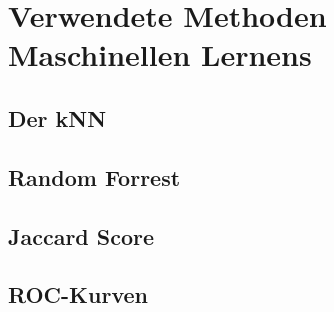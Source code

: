 \section{Verwendete Methoden Maschinellen Lernens}
\label{sec:lerner}

\subsection{Der kNN}

\subsection{Random Forrest}

\subsection{Jaccard Score}

\subsection{ROC-Kurven}